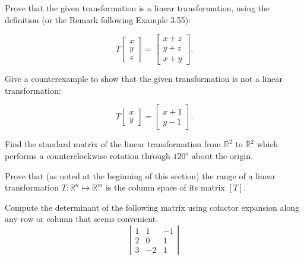 \documentclass[12pt,letterpaper]{hmcpset}
\newcommand{\m}[1]{\begin{bmatrix} #1 \end{bmatrix}}
\begin{document}

\begin{problem}[3.6.6]
    Prove that the given transformation
    is a linear transformation, using
    the definition (or the Remark following
    Example 3.55):

    \[
        T\m{x\\y\\z} = \m{x+z\\y+z\\x+y}.
    \]
\end{problem}

\begin{solution}
\vfill
\end{solution}
\newpage

\begin{problem}[3.6.10]
    Give a counterexample to show that
    the given transformation is not a
    linear transformation:

    \[
        T\m{x\\y} = \m{x+1\\y-1}.
    \]
\end{problem}

\begin{solution}
\vfill
\end{solution}
\newpage

\begin{problem}[3.6.20]
    Find the standard matrix of the
    linear transformation from
    $\mathbb{R}^2$ to $\mathbb{R}^2$
    which performs a counterclockwise
    rotation through $120^o$ about
    the origin.
\end{problem}

\begin{solution}
\vfill
\end{solution}
\newpage

\begin{problem}[3.6.54]
    Prove that (as noted at the 
    beginning of this section)
    the range of a linear transformation 
    $T : \mathbb{R}^n \mapsto \mathbb{R}^m$
    is the column space of its matrix $[T]$.
\end{problem}

\begin{solution}
\vfill
\end{solution}
\newpage

\begin{problem}[4.2.8]
    Compute the determinant of the following
    matrix using cofactor expansion along
    any row or column that seems convenient.
    \[
        \left| \begin{matrix}
            1&1&-1\\
            2&0&1\\
            3&-2&1
        \end{matrix} \right|
    \]
\end{problem}
\end{document}
